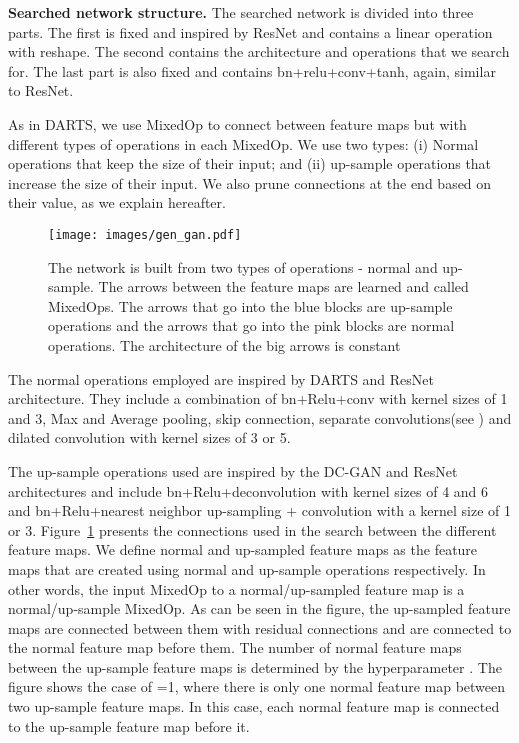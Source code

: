 \documentclass[10pt,twocolumn,letterpaper]{article}
\begin{document}
{\bf Searched network structure.} The searched network is divided into three parts. The first is fixed and inspired by ResNet and contains a linear operation with reshape. The second contains the architecture and operations that we search for. The last part is also fixed and contains bn+relu+conv+tanh, again, similar to ResNet.



As in DARTS, we use MixedOp to connect between feature maps but with different types of operations in each MixedOp. We use two types: (i) Normal operations that keep the size of their input; and (ii) up-sample operations that increase the size of their input.
We also prune connections at the end based on their value, as we explain hereafter. 

\begin{figure}
\centering
\texttt{[image: images/gen\_gan.pdf]}
\caption{The network is built from two types of operations - normal and up-sample. The arrows between the feature maps are learned and called MixedOps. The arrows that go into the blue blocks are up-sample operations and the arrows that go into the pink blocks are normal operations. The architecture of the big arrows is constant }
\label{images/example network}
\end{figure}



The normal operations employed are inspired by DARTS and ResNet architecture. They include a combination of bn+Relu+conv with kernel sizes of 1 and 3, Max and Average pooling, skip connection, separate convolutions(see \cite{liu19darts}) and dilated convolution with kernel sizes of 3 or 5. 

The up-sample operations used are inspired by the DC-GAN and ResNet architectures and include bn+Relu+deconvolution with kernel sizes of 4 and 6 and bn+Relu+nearest neighbor up-sampling + convolution with a kernel size of 1 or 3.
Figure~\ref{images/example network} presents the connections used in the search between the different feature maps. We define normal and up-sampled feature maps as the feature maps that are created using normal and up-sample operations respectively. In other words, the input MixedOp to a normal/up-sampled feature map is a normal/up-sample MixedOp. 
As can be seen in the figure, the up-sampled feature maps are connected between them with residual connections and are connected to the normal feature map before them.
The number of normal feature maps between the up-sample feature maps is determined by the hyperparameter . The figure shows the case of =1, where there is only one normal feature map between two up-sample feature maps. In this case, each normal feature map is connected to the up-sample feature map before it.
\end{document}
